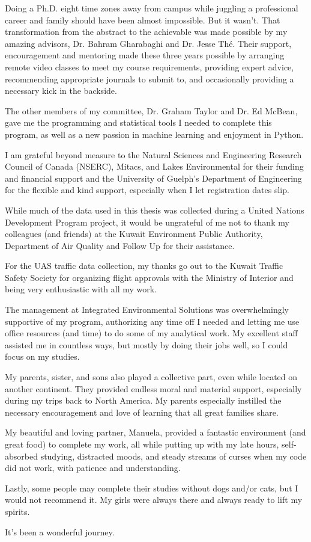 \begin{acknowledgements}\label{acknow}

Doing a Ph.D. eight time zones away from campus while juggling a professional career and family should have been almost impossible. But it wasn't. That transformation from the abstract to the achievable was made possible by my amazing advisors, Dr. Bahram Gharabaghi and Dr. Jesse Th\'e. Their support, encouragement and mentoring made these three years possible by arranging remote video classes to meet my course requirements, providing expert advice, recommending appropriate journals to submit to, and occasionally providing a necessary kick in the backside.

The other members of my committee, Dr. Graham Taylor and Dr. Ed McBean, gave me the programming and statistical tools I needed to complete this program, as well as a new passion in machine learning and enjoyment in Python.

I am grateful beyond measure to the Natural Sciences and Engineering Research Council of Canada (NSERC), Mitacs, and Lakes Environmental for their funding and financial support and the University of Guelph's Department of Engineering for the flexible and kind support, especially when I let registration dates slip.

While much of the data used in this thesis was collected during a United Nations Development Program project, it would be ungrateful of me not to thank my colleagues (and friends) at the Kuwait Environment Public Authority, Department of Air Quality and Follow Up for their assistance.

For the UAS traffic data collection, my thanks go out to the Kuwait Traffic Safety Society for organizing flight approvals with the Ministry of Interior and being very enthusiastic with all my work.

The management at Integrated Environmental Solutions was overwhelmingly supportive of my program, authorizing any time off I needed and letting me use office resources (and time) to do some of my analytical work. My excellent staff assisted me in countless ways, but mostly by doing their jobs well, so I could focus on my studies.

My parents, sister, and sons also played a collective part, even while located on another continent. They provided endless moral and material support, especially during my trips back to North America. My parents especially instilled the necessary encouragement and love of learning that all great families share.

My beautiful and loving partner, Manuela, provided a fantastic environment (and great food) to complete my work, all while putting up with my late hours, self-absorbed studying, distracted moods, and steady streams of curses when my code did not work, with patience and understanding.

Lastly, some people may complete their studies without dogs and/or cats, but I would not recommend it. My girls were always there and always ready to lift my spirits.

It's been a wonderful journey.

\end{acknowledgements}
